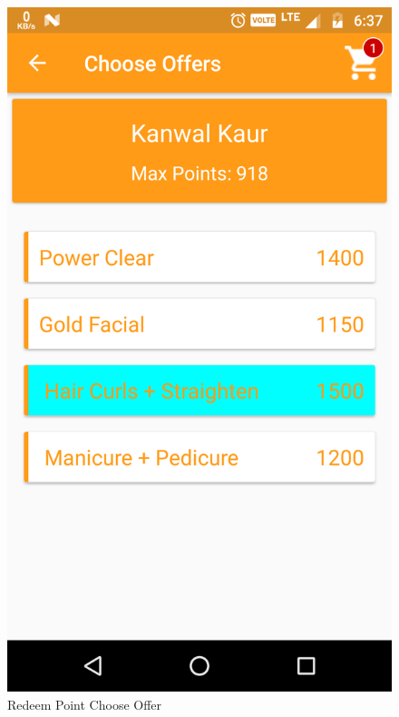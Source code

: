 \\
\begin{figure}[h]
	\centering
	\includegraphics[width=0.7\linewidth]{RedeemPointChooseOffer}
	\caption{Redeem Point Choose Offer}
\end{figure}
\pagebreak

